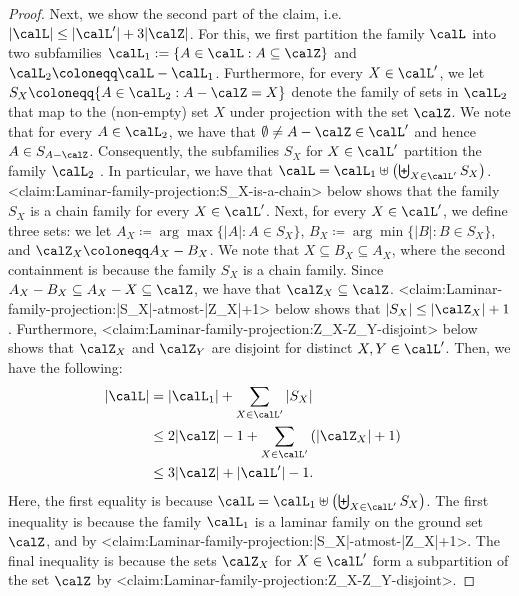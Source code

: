 \documentclass{article}
\def\Cref#1{<#1>}%
\newcommand{\knote}[1]{{\color{red}[{\tiny Karthik: \bf #1}]\marginpar{\color{red}*}}}
\begin{document}
\begin{proof}
    Next, we show the second part of the claim, i.e. $|\calL| \leq |\calL'| + 3|\calZ|$. For this, we first  partition the family $\calL$ into two subfamilies $\calL_1 : = \{A \in \calL : A \subseteq \calZ\}$ and $\calL_2 \coloneqq  \calL - \calL_1$. Furthermore, for every $X \in \calL'$, we let $S_X \coloneqq  \{A \in \calL_2 : A - \calZ = X\}$ denote the family of sets in $\calL_2$ that map to the (non-empty) set $X$ under projection with the set $\calZ$. 
    We note that for every $A \in \calL_2$, we have that $\emptyset \not = A - \calZ \in \calL'$ and hence $A \in S_{A - \calZ}$. Consequently, the subfamilies $S_X$ for $X \in \calL'$ partition the family $\calL_2$ 
    . In particular, we have that $\calL = \calL_1 \uplus \left(\biguplus_{X \in \calL'} S_X \right)$. \Cref{claim:Laminar-family-projection:S_X-is-a-chain} below shows that the family $S_X$ is a chain family for every $X \in \calL'$. Next, for every $X \in \calL'$, we define three sets: we let $A_X \coloneqq  \arg\max\{|A| : A \in S_X\}$, $B_{X} \coloneqq  \arg\min\{|B| : B \in S_X\}$, and $\calZ_X\coloneqq A_X-B_X$. 
    We note that $X \subseteq B_X \subseteq A_X$, where the second containment is because the family $S_X$ is a chain family. 
    Since $A_X - B_X \subseteq A_X - X \subseteq \calZ$, we have that $\calZ_X \subseteq \calZ$. \Cref{claim:Laminar-family-projection:|S_X|-atmost-|Z_X|+1} below shows that $|S_X| \leq |\calZ_X| + 1$. Furthermore, \Cref{claim:Laminar-family-projection:Z_X-Z_Y-disjoint} below shows that $\calZ_X$ and $\calZ_Y$ are disjoint for distinct $X,Y \in \calL'$. Then, we have the following:
\begin{align*}
        |\calL| & = |\calL_1| + \sum_{X \in \calL'} |S_X|&\\
        & \leq 2|\calZ| - 1 + \sum_{X \in \calL'}\left(|\calZ_X| + 1\right)&\\
        &\le 3|\calZ| + |\calL'|-1.&
    \end{align*}
    Here, the first equality is because $\calL = \calL_1 \uplus \left(\biguplus_{X \in \calL'} S_X \right)$. The first inequality is because the family $\calL_1$ is a laminar family on the ground set $\calZ$, and by \Cref{claim:Laminar-family-projection:|S_X|-atmost-|Z_X|+1}. The final inequality is because the sets $\calZ_X$ for $X \in\calL'$ form a subpartition of the set $\calZ$ by \Cref{claim:Laminar-family-projection:Z_X-Z_Y-disjoint}.
\end{proof}
\end{document}
